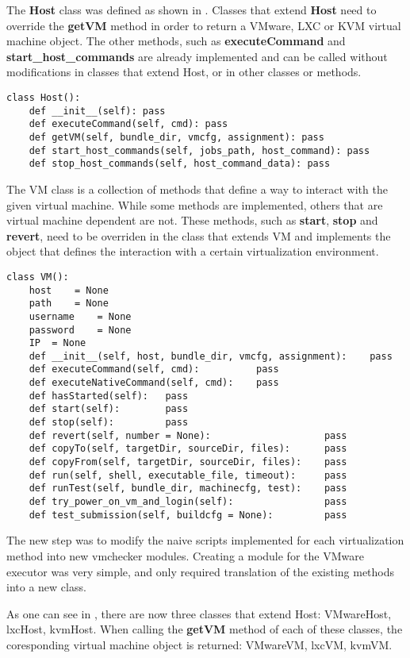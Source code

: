 The {\bf Host} class was defined as shown in .
Classes that extend {\bf Host} need to override the {\bf getVM} method in order to return a
VMware, LXC or KVM virtual machine object. The other methods, such as \textbf{executeCommand}
and \textbf{start_host_commands} are already implemented and can be called
without modifications in classes that extend Host, or in other classes or methods.

\lstset{caption=Generic Host Implementation, language=python, label=lst:generic-host}
\begin{lstlisting}
class Host():
    def __init__(self): pass
    def executeCommand(self, cmd): pass
    def getVM(self, bundle_dir, vmcfg, assignment): pass
    def start_host_commands(self, jobs_path, host_command): pass
    def stop_host_commands(self, host_command_data): pass
\end{lstlisting}


The VM class is a collection of methods that define a way to interact with the
given virtual machine. While some methods are implemented, others that are
virtual machine dependent are not. These methods, such as \textbf{start}, 
\textbf{stop} and \textbf{revert}, need to be overriden in the 
class that extends VM and implements the object that defines the interaction
with a certain virtualization environment.

\lstset{caption=Generic VM Implementation, language=python, label=lst:generic-vm}
\begin{lstlisting}
class VM():
    host 	= None
    path 	= None
    username	= None
    password	= None
    IP	= None
    def __init__(self, host, bundle_dir, vmcfg, assignment):    pass
    def executeCommand(self, cmd):          pass
    def executeNativeCommand(self, cmd):    pass
    def hasStarted(self):   pass
    def start(self):        pass
    def stop(self):         pass
    def revert(self, number = None):                    pass
    def copyTo(self, targetDir, sourceDir, files):      pass
    def copyFrom(self, targetDir, sourceDir, files):    pass
    def run(self, shell, executable_file, timeout):     pass
    def runTest(self, bundle_dir, machinecfg, test):    pass
    def try_power_on_vm_and_login(self):                pass
    def test_submission(self, buildcfg = None):         pass
\end{lstlisting}


The new step was to modify the naive scripts implemented for each virtualization
method into new vmchecker modules. Creating a module for the VMware executor
was very simple, and only required translation of the existing methods into a new
class.

As one can see in , there are now three
classes that extend Host: VMwareHost, lxcHost, kvmHost. When calling the
{\bf getVM} method of each of these classes, the coresponding virtual
machine object is returned: VMwareVM, lxcVM, kvmVM.

\begin{center}
\end{center}



